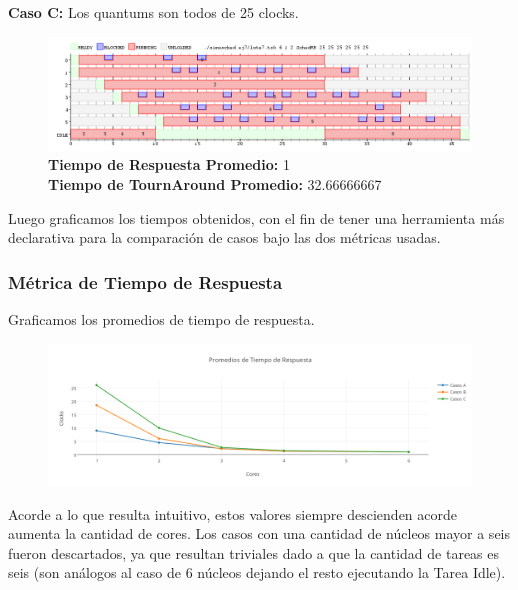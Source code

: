 \documentclass[a4paper]{article}
\begin{document}
	\textbf{Caso C:}  Los quantums son todos de 25 clocks.
	
		 \begin{figure}[h!]
   \begin{center}
 	\includegraphics[scale=0.5]{imagenes/ej7/6nucleoC.png}
 	\textbf{Tiempo de Respuesta Promedio:} 1 \\
 	\textbf{Tiempo de TournAround Promedio:} 32.66666667 \\
   \end{center}
 \end{figure} 

\newpage

Luego graficamos los tiempos obtenidos, con el fin de tener una herramienta m\'as declarativa para la comparaci\'on de casos bajo las dos m\'etricas usadas.

\subsubsection*{M\'etrica de Tiempo de Respuesta}

Graficamos los promedios de tiempo de respuesta.
		 \begin{figure}[h!]
   \begin{center}
 	\includegraphics[scale=1.2]{imagenes/ej7/TiemposResp.png}
   \end{center}
 \end{figure} 
 
 Acorde a lo que resulta intuitivo, estos valores siempre descienden acorde aumenta la cantidad de cores. Los casos con una cantidad de n\'ucleos mayor a seis fueron descartados, ya que resultan triviales dado a que la cantidad de tareas es seis (son an\'alogos al caso de 6 n\'ucleos dejando el resto ejecutando la Tarea Idle).
 
\end{document}
